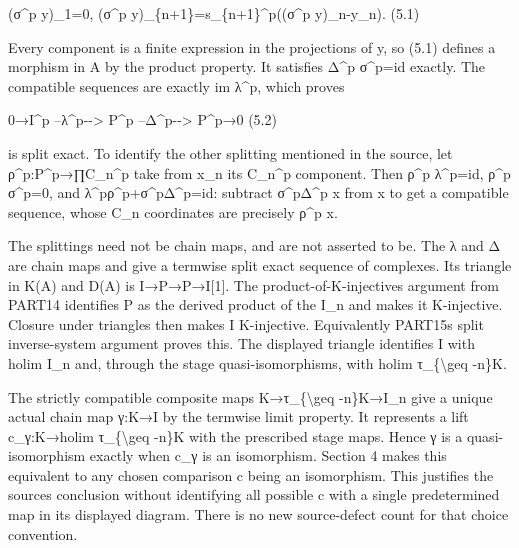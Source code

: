 \documentclass[11pt]{article}
\begin{document}
(σ\^{}p y)\allowbreak{}\_\allowbreak{}1\allowbreak{}=0,\allowbreak{} (σ\^{}p y)\allowbreak{}\_\allowbreak{}\{n\allowbreak{}+1\}\allowbreak{}=s\_\allowbreak{}\{n\allowbreak{}+1\}\textasciicircum{}p((σ\textasciicircum{}p y)\allowbreak{}\_\allowbreak{}n-y\_\allowbreak{}n)\allowbreak{}. (5.1)\allowbreak{}

Every component is a finite expression in the projections of y,\allowbreak{} so (5.1)\allowbreak{} defines a morphism in A by the product property. It satisfies Δ\^{}p σ\textasciicircum{}p\allowbreak{}=id exactly. The compatible sequences are exactly im λ\textasciicircum{}p,\allowbreak{} which proves

0\allowbreak{}→I\textasciicircum{}p --λ\textasciicircum{}p-\allowbreak{}-> P\^{}p --Δ\textasciicircum{}p-\allowbreak{}-> P\textasciicircum{}p\allowbreak{}→0 (5.2)\allowbreak{}

is split exact. To identify the other splitting mentioned in the source,\allowbreak{} let ρ\textasciicircum{}p:\allowbreak{}P\textasciicircum{}p\allowbreak{}→∏C\_\allowbreak{}n\textasciicircum{}p take from x\_\allowbreak{}n its C\_\allowbreak{}n\textasciicircum{}p component. Then ρ\^{}p λ\textasciicircum{}p\allowbreak{}=id,\allowbreak{} ρ\^{}p σ\textasciicircum{}p\allowbreak{}=0,\allowbreak{} and λ\textasciicircum{}pρ\textasciicircum{}p\allowbreak{}+σ\textasciicircum{}pΔ\textasciicircum{}p\allowbreak{}=id:\allowbreak{} subtract σ\^{}pΔ\^{}p x from x to get a compatible sequence,\allowbreak{} whose C\_\allowbreak{}n coordinates are precisely ρ\^{}p x.

The splittings need not be chain maps,\allowbreak{} and are not asserted to be. The λ and Δ are chain maps and give a termwise split exact sequence of complexes. Its triangle in K(A)\allowbreak{} and D(A)\allowbreak{} is I\allowbreak{}→P\allowbreak{}→P\allowbreak{}→I[1]\allowbreak{}. The product-of-K-injectives argument from PART14 identifies P as the derived product of the I\_\allowbreak{}n and makes it K-injective. Closure under triangles then makes I K-injective. Equivalently PART15\textquotesingle s split inverse-system argument proves this. The displayed triangle identifies I with holim I\_\allowbreak{}n and,\allowbreak{} through the stage quasi-isomorphisms,\allowbreak{} with holim τ\_\allowbreak{}\{\textbackslash{}geq -n\}K.

The strictly compatible composite maps K\allowbreak{}→τ\_\allowbreak{}\{\textbackslash{}geq -n\}K\allowbreak{}→I\_\allowbreak{}n give a unique actual chain map γ:\allowbreak{}K\allowbreak{}→I by the termwise limit property. It represents a lift c\_\allowbreak{}γ:\allowbreak{}K\allowbreak{}→holim τ\_\allowbreak{}\{\textbackslash{}geq -n\}K with the prescribed stage maps. Hence γ is a quasi-isomorphism exactly when c\_\allowbreak{}γ is an isomorphism. Section 4 makes this equivalent to any chosen comparison c being an isomorphism. This justifies the source\textquotesingle s conclusion without identifying all possible c with a single predetermined map in its displayed diagram. There is no new source-defect count for that choice convention.
\end{document}
